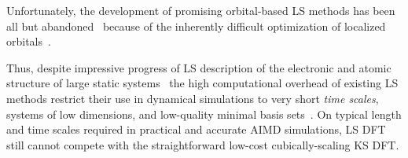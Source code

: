 \documentclass[aps,prl,reprint,amsmath,amssymb]{revtex4-1}
\begin{document}
Unfortunately, the development of promising orbital-based LS methods has been all but abandoned~\cite{a:weitao-yang-2013,a:ls-tsuchida-aomm} because of the inherently difficult optimization of localized orbitals~\cite{a:ls-rev-1999,a:ls-mauri-galli-car-1993,a:ls-ordejon-1995,a:ls-fattebert-2004,a:weitao-yang-2013,a:ls-tsuchida-aomm}. 


Thus, despite impressive progress of LS description of the electronic and atomic structure of large static systems~\cite{Bowler2010,a:ls-dm-sign} the high computational overhead of existing LS methods restrict their use in dynamical simulations to very short \emph{time scales}, systems of low dimensions, and low-quality minimal basis sets~\cite{a:ls-dm-sign, Otsuka2016, Hine2011, Bowler2010}. 
On typical length and time scales required in practical and accurate AIMD simulations, LS DFT still cannot compete with the straightforward low-cost cubically-scaling KS DFT.
\end{document}
